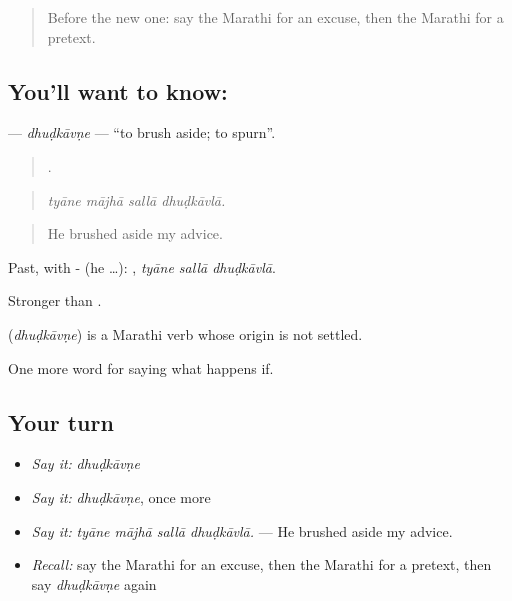 \label{lesson:MR-C393-dhudkavne}



\begin{quote}
Before the new one: say the Marathi for an excuse, then the Marathi for a pretext.
\end{quote}

\subsection*{You'll want to know: }
\textbf{} — \emph{dhuḍkāvṇe} — \textquotedblleft{}to brush aside; to spurn\textquotedblright{}.

\begin{quote}
   .
\end{quote}

\begin{quote}
\emph{tyāne mājhā sallā dhuḍkāvlā.}
\end{quote}

\begin{quote}
He brushed aside my advice.
\end{quote}

Past, with - (he …):   , \emph{tyāne sallā dhuḍkāvlā}.

Stronger than .

\begin{cousinweb}
\textbf{} (\emph{dhuḍkāvṇe}) is a Marathi verb whose origin is not settled.
\end{cousinweb}

\begin{grammarlens}[title={What you've built}]
One more word for saying what happens if.
\end{grammarlens}

\subsection*{Your turn}
\begin{itemize}
\raggedright
  \item \emph{Say it:} \emph{dhuḍkāvṇe}
  \item \emph{Say it:} \emph{dhuḍkāvṇe}, once more
  \item \emph{Say it:} \emph{tyāne mājhā sallā dhuḍkāvlā.} — He brushed aside my advice.
  \item \emph{Recall:} say the Marathi for an excuse, then the Marathi for a pretext, then say \emph{dhuḍkāvṇe} again
\end{itemize}

